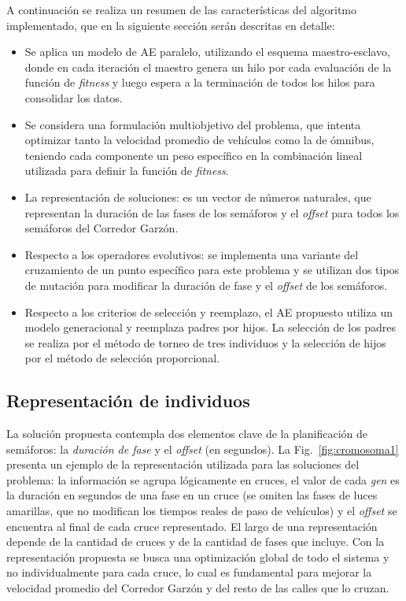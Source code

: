 A continuación se realiza un resumen de las características del algoritmo implementado, que en la siguiente sección serán descritas en detalle:
\begin{itemize}
	
	\item Se aplica un modelo de AE paralelo, utilizando el esquema maestro-esclavo, donde en cada iteración el maestro genera un hilo por cada evaluación de la función de \emph{fitness} y luego espera a la terminación de todos los hilos para consolidar los datos. 
	\item Se considera una formulación multiobjetivo del problema, que intenta optimizar tanto la velocidad promedio de vehículos como la de ómnibus, teniendo cada componente un peso específico en la combinación lineal utilizada para definir la función de \emph{fitness}.
	\item La representación de soluciones: es un vector de números naturales, que representan la duración de las fases de los semáforos y el \emph{offset} para todos los semáforos del Corredor Garzón.
	\item Respecto a los operadores evolutivos: se implementa una variante del cruzamiento de un punto específico para este problema y se utilizan dos tipos de mutación para modificar la duración de fase y el \emph{offset} de los semáforos.
	\item Respecto a los criterios de selección y reemplazo, el AE propuesto utiliza un modelo generacional y reemplaza padres por hijos. La selección de los padres se realiza por el método de torneo de tres individuos y la selección de hijos por el método de selección proporcional.
	
\end{itemize}

\subsection{Representación de individuos}


La solución propuesta contempla dos elementos clave de la planificación de semáforos: la \textit{duración de fase} y el \emph{offset} (en segundos). La Fig.~\ref{fig:cromosoma1} presenta un ejemplo de la representación utilizada para las soluciones del problema: la información se agrupa lógicamente en cruces, el valor de cada \textit{gen} es la duración en segundos de una fase en un cruce (se omiten las fases de  luces amarillas, que no modifican los tiempos reales de paso de vehículos) y el \emph{offset} se encuentra al final de cada cruce representado. El largo de una representación depende de la cantidad de cruces y de la cantidad de fases que incluye. Con la representación propuesta se busca una optimización global de todo el sistema y no individualmente para cada cruce, lo cual es fundamental para mejorar la velocidad promedio del Corredor Garzón y del resto de las calles que lo cruzan.

